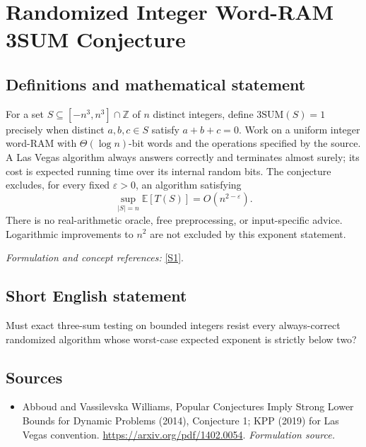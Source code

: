 \documentclass[11pt]{article}
\begin{document}
\section*{\texorpdfstring{Randomized Integer Word-RAM 3SUM Conjecture}{Randomized Integer Word-RAM 3SUM Conjecture}}\label{161}
\subsection{Definitions and mathematical statement}
For a set $S\subseteq[-n^3,n^3]\cap{\mathbb{Z}}$ of $n$ distinct integers, define
$\mathrm{3SUM}(S)=1$ precisely when distinct $a,b,c\in S$ satisfy $a+b+c=0$. Work on a uniform integer word-RAM with $\Theta(\log n)$-bit words and the operations specified by the source. A Las Vegas algorithm always answers correctly and terminates almost surely; its cost is expected running time over its internal random bits. The conjecture excludes, for every fixed ${\varepsilon}>0$, an algorithm satisfying
\[
 \sup_{|S|=n}{\mathbb{E}}[T(S)]=O(n^{2-{\varepsilon}}).
\]
There is no real-arithmetic oracle, free preprocessing, or input-specific advice. Logarithmic improvements to $n^2$ are not excluded by this exponent statement.
\par\smallskip\textit{Formulation and concept references:} \href{https://arxiv.org/pdf/1402.0054}{[S1]}.

\subsection{Short English statement}
Must exact three-sum testing on bounded integers resist every always-correct randomized algorithm whose worst-case expected exponent is strictly below two?
\subsection{Sources}
\begin{itemize}
\item[S1]Abboud and Vassilevska Williams, Popular Conjectures Imply Strong Lower Bounds for Dynamic Problems (2014), Conjecture 1; KPP (2019) for Las Vegas convention.
\url{https://arxiv.org/pdf/1402.0054}.
\textit{Formulation source.}
\end{itemize}
\end{document}
